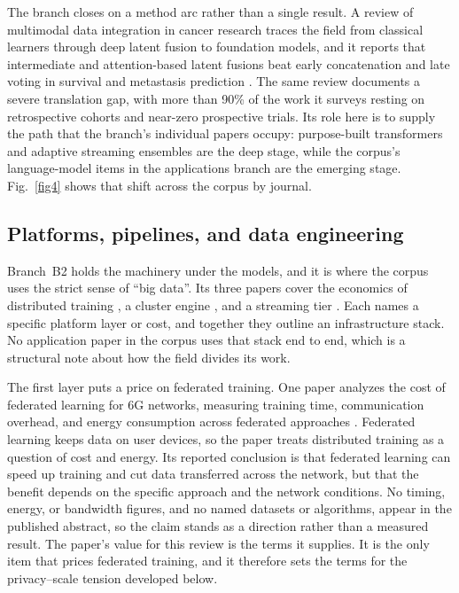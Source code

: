 \documentclass[pdflatex,sn-basic,Numbered]{sn-jnl}%
\begin{document}
The branch closes on a method arc rather than a single result. A review of multimodal data integration in cancer research traces the field from classical learners through deep latent fusion to foundation models, and it reports that intermediate and attention-based latent fusions beat early concatenation and late voting in survival and metastasis prediction \citep{muneer2026classical}. The same review documents a severe translation gap, with more than 90\% of the work it surveys resting on retrospective cohorts and near-zero prospective trials. Its role here is to supply the path that the branch's individual papers occupy: purpose-built transformers \citep{xiao2025katn} and adaptive streaming ensembles \citep{gunbilek2026enhanced} are the deep stage, while the corpus's language-model items in the applications branch are the emerging stage. Fig.~\ref{fig4} shows that shift across the corpus by journal.

\subsection{Platforms, pipelines, and data engineering}\label{subsec24}

Branch~B2 holds the machinery under the models, and it is where the corpus uses the strict sense of ``big data''. Its three papers cover the economics of distributed training \citep{teixeira2025efficient}, a cluster engine \citep{ghodsi2026opinion}, and a streaming tier \citep{saleh2025cloud}. Each names a specific platform layer or cost, and together they outline an infrastructure stack. No application paper in the corpus uses that stack end to end, which is a structural note about how the field divides its work.

The first layer puts a price on federated training. One paper analyzes the cost of federated learning for 6G networks, measuring training time, communication overhead, and energy consumption across federated approaches \citep{teixeira2025efficient}. Federated learning keeps data on user devices, so the paper treats distributed training as a question of cost and energy. Its reported conclusion is that federated learning can speed up training and cut data transferred across the network, but that the benefit depends on the specific approach and the network conditions. No timing, energy, or bandwidth figures, and no named datasets or algorithms, appear in the published abstract, so the claim stands as a direction rather than a measured result. The paper's value for this review is the terms it supplies. It is the only item that prices federated training, and it therefore sets the terms for the privacy--scale tension developed below.
\end{document}
